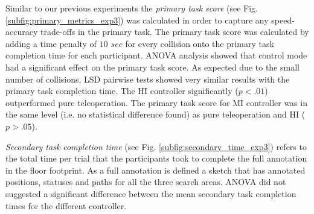 \documentclass[a4paper,12pt,oneside,openright]{bhamthesis}
\begin{document}
Similar to our previous experiments the \textit{primary task score} (see Fig. \ref{subfig:primary_metrics_exp3}) was calculated in order to capture any speed-accuracy trade-offs in the primary task. The primary task score was calculated by adding a time penalty of \textit{$10$ $sec$} for every collision onto the primary task completion time for each participant. ANOVA analysis showed that control mode had a significant effect on the primary task score. As expected due to the small number of collisions, LSD pairwise tests showed very similar results with the primary task completion time. The HI controller significantly (\textit{$p < .01$}) outperformed pure teleoperation. The primary task score for MI controller was in the same level (i.e. no statistical difference found) as pure teleoperation and HI (\textit{$p > .05$}). 

\textit{Secondary task completion time} (see Fig. \ref{subfig:secondary_time_exp3}) refers to the total time per trial that the participants took to complete the full annotation in the floor footprint. As a full annotation is defined a sketch that has annotated positions, statuses and paths for all the three search areas. ANOVA did not suggested a significant difference between the mean secondary task completion times for the different controller.
\end{document}
